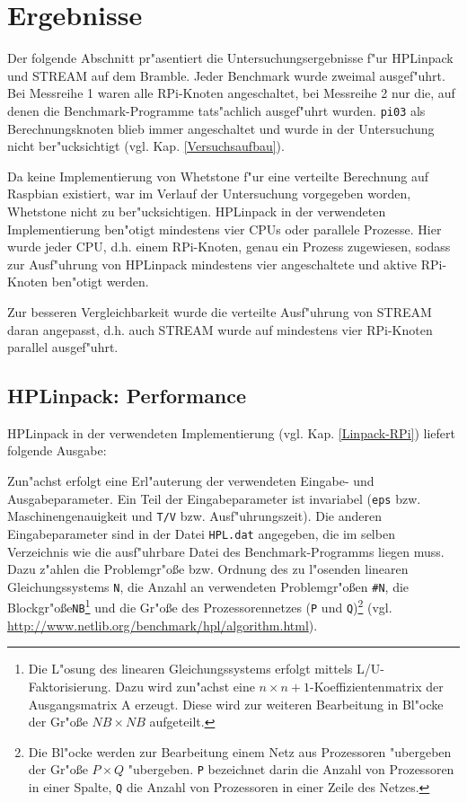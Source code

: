 \section{Ergebnisse}\label{Ergebnisse}

Der folgende Abschnitt pr"asentiert die Untersuchungsergebnisse f"ur HPLinpack und STREAM auf dem Bramble. Jeder Benchmark wurde zweimal ausgef"uhrt. Bei Messreihe 1 waren alle RPi-Knoten angeschaltet, bei Messreihe 2 nur die, auf denen die Benchmark-Programme tats"achlich ausgef"uhrt wurden. \texttt{pi03} als Berechnungsknoten blieb immer angeschaltet und wurde in der Untersuchung nicht ber"ucksichtigt (vgl. Kap. \ref{Versuchsaufbau}).

Da keine Implementierung von Whetstone f"ur eine verteilte Berechnung auf Raspbian existiert, war im Verlauf der Untersuchung vorgegeben worden, Whetstone nicht zu ber"ucksichtigen. HPLinpack in der verwendeten Implementierung ben"otigt mindestens vier CPUs oder parallele Prozesse. Hier wurde jeder CPU, d.h. einem RPi-Knoten, genau ein Prozess zugewiesen, sodass zur Ausf"uhrung von HPLinpack mindestens vier angeschaltete und aktive RPi-Knoten ben"otigt werden. 

Zur besseren Vergleichbarkeit wurde die verteilte Ausf"uhrung von STREAM daran angepasst, d.h. auch STREAM wurde auf mindestens vier RPi-Knoten parallel ausgef"uhrt. 

\subsection{HPLinpack: Performance}\label{Ergebnisse-HPL}

HPLinpack in der verwendeten Implementierung (vgl. Kap. \ref{Linpack-RPi}) liefert folgende Ausgabe:

Zun"achst erfolgt eine Erl"auterung der verwendeten Eingabe- und Ausgabeparameter. Ein Teil der Eingabeparameter ist invariabel (\texttt{eps} bzw. Maschinengenauigkeit und \texttt{T/V} bzw. Ausf"uhrungszeit). Die anderen Eingabeparameter sind in der Datei \texttt{HPL.dat} angegeben, die im selben Verzeichnis wie die ausf"uhrbare Datei des Benchmark-Programms liegen muss. Dazu z"ahlen die Problemgr"o\ss e bzw. Ordnung des zu l"osenden linearen Gleichungssystems \texttt{N}, die Anzahl an verwendeten Problemgr"o\ss en \texttt{\#N}, die Blockgr"o\ss e\texttt{NB}\footnote{Die L"osung des linearen Gleichungssystems erfolgt mittels L/U-Faktorisierung. Dazu wird zun"achst eine $n\times n+1$-Koeffizientenmatrix der Ausgangsmatrix A erzeugt. Diese wird zur weiteren Bearbeitung in Bl"ocke der Gr"o\ss e $NB\times NB$ aufgeteilt.} und die Gr"o\ss e des Prozessorennetzes (\texttt{P} und \texttt{Q})\footnote{Die Bl"ocke werden zur Bearbeitung einem Netz aus Prozessoren "ubergeben der Gr"o\ss e $P\times Q$ "ubergeben. \texttt{P} bezeichnet darin die Anzahl von Prozessoren in einer Spalte, \texttt{Q} die Anzahl von Prozessoren in einer Zeile des Netzes.} (vgl. \url{http://www.netlib.org/benchmark/hpl/algorithm.html}). 

